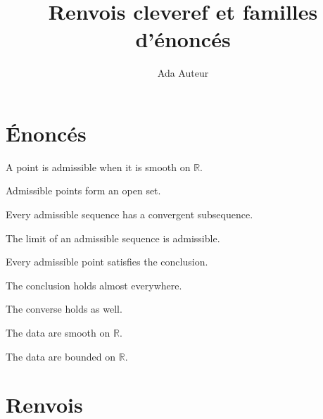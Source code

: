 \documentclass[11pt]{ocots-paper}
\title[Exemple cleveref]{Renvois cleveref et familles d'\'enonc\'es}
\author{Ada Auteur}
\newcommand{\R}{\mathbb{R}}
\begin{document}
\maketitle

\section{\'Enonc\'es}

\begin{definition}
\label{def:admissible}
A point is admissible when it is smooth on $\R$.
\end{definition}

\begin{proposition}[Stability]
\label{prop:stability}
Admissible points form an open set.
\end{proposition}

\begin{lemma}[Compactness]
\label{lem:compactness}
Every admissible sequence has a convergent subsequence.
\end{lemma}

\begin{lemma}[Closedness]
\label{lem:closedness}
The limit of an admissible sequence is admissible.
\end{lemma}

\begin{theorem}
\label{thm:main}
Every admissible point satisfies the conclusion.
\end{theorem}

\begin{corollary}[Consequence]
\label{cor:consequence}
The conclusion holds almost everywhere.
\end{corollary}

\begin{conjecture}
\label{conj:open}
The converse holds as well.
\end{conjecture}

\begin{hypothesis}[Regularity]
\label{hyp:regularity}
The data are smooth on $\R$.
\end{hypothesis}

\begin{hypothesis}[Boundedness]
\label{hyp:bounded}
The data are bounded on $\R$.
\end{hypothesis}

\section{Renvois}
\end{document}
